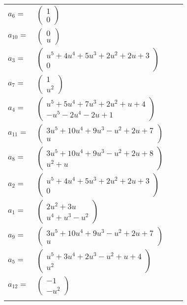 \documentclass[1p]{elsarticle_modified}
\theoremstyle{definition}
\begin{document}
\begin{tabular}{m{7pt} m{180pt} m{7pt} m{180pt} }
\flushright $a_{6}=$&$\begin{pmatrix}1\\0\end{pmatrix}$ \\
\flushright $a_{10}=$&$\begin{pmatrix}0\\u\end{pmatrix}$ \\
\flushright $a_{3}=$&$\begin{pmatrix}u^5+4 u^4+5 u^3+2 u^2+2 u+3\\0\end{pmatrix}$ \\
\flushright $a_{7}=$&$\begin{pmatrix}1\\u^2\end{pmatrix}$ \\
\flushright $a_{4}=$&$\begin{pmatrix}u^5+5 u^4+7 u^3+2 u^2+u+4\\- u^5-2 u^4-2 u+1\end{pmatrix}$ \\
\flushright $a_{11}=$&$\begin{pmatrix}3 u^5+10 u^4+9 u^3- u^2+2 u+7\\u\end{pmatrix}$ \\
\flushright $a_{8}=$&$\begin{pmatrix}3 u^5+10 u^4+9 u^3- u^2+2 u+8\\u^2+u\end{pmatrix}$ \\
\flushright $a_{2}=$&$\begin{pmatrix}u^5+4 u^4+5 u^3+2 u^2+2 u+3\\0\end{pmatrix}$ \\
\flushright $a_{1}=$&$\begin{pmatrix}2 u^2+3 u\\u^4+u^3- u^2\end{pmatrix}$ \\
\flushright $a_{9}=$&$\begin{pmatrix}3 u^5+10 u^4+9 u^3- u^2+2 u+7\\u\end{pmatrix}$ \\
\flushright $a_{5}=$&$\begin{pmatrix}u^5+3 u^4+2 u^3- u^2+u+4\\u^2\end{pmatrix}$ \\
\flushright $a_{12}=$&$\begin{pmatrix}-1\\- u^2\end{pmatrix}$\\&\end{tabular}
\end{document}
